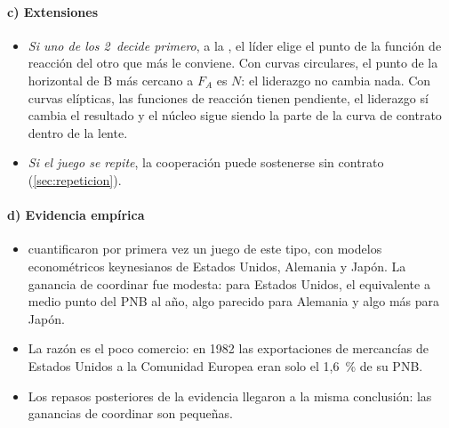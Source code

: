 \documentclass[11pt]{article}
\begin{document}
\paragraph{c) Extensiones}
\begin{itemize}
\item \emph{Si uno de los 2~decide primero}, a la  , el líder elige el punto de la función de reacción del otro que más le conviene. Con curvas circulares, el punto de la horizontal de B más cercano a $F_A$ es $N$: el liderazgo no cambia nada. Con curvas elípticas, las funciones de reacción tienen pendiente, el liderazgo sí cambia el resultado y el núcleo sigue siendo la parte de la curva de contrato dentro de la lente\nocite{Hamada1976Strategic}.
\item \emph{Si el juego se repite}, la cooperación puede sostenerse sin contrato (\ref{sec:repeticion}).
\end{itemize}

\paragraph{d) Evidencia empírica}
\begin{itemize}
\item \textcite{OudizSachs1984} cuantificaron por primera vez un juego de este tipo, con modelos econométricos keynesianos de Estados Unidos, Alemania y Japón. La ganancia de coordinar fue modesta: para Estados Unidos, el equivalente a medio punto del PNB al año, algo parecido para Alemania y algo más para Japón.
\item La razón es el poco comercio: en 1982 las exportaciones de mercancías de Estados Unidos a la Comunidad Europea eran solo el 1,6~\% de su PNB\nocite{OudizSachs1984}.
\item Los repasos posteriores de la evidencia llegaron a la misma conclusión: las ganancias de coordinar son pequeñas\nocite{McKibbin1997Empirical,OstryGhosh2013}.
\end{itemize}
\end{document}
